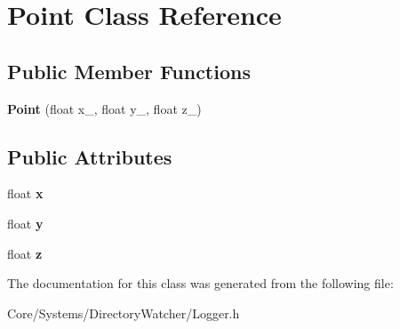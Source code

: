 \hypertarget{classPoint}{\section{Point Class Reference}
\label{classPoint}
}
\subsection*{Public Member Functions}
\begin{DoxyCompactItemize}
\item 
\hypertarget{classPoint_ad56008741db728440b3d469e5fb5cc82}{{\bfseries Point} (float x\-\_\-, float y\-\_\-, float z\-\_\-)}\label{classPoint_ad56008741db728440b3d469e5fb5cc82}

\end{DoxyCompactItemize}
\subsection*{Public Attributes}
\begin{DoxyCompactItemize}
\item 
\hypertarget{classPoint_a05dfe2dfbde813ad234b514f30e662f1}{float {\bfseries x}}\label{classPoint_a05dfe2dfbde813ad234b514f30e662f1}

\item 
\hypertarget{classPoint_a6101960c8d2d4e8ea1d32c9234bbeb8d}{float {\bfseries y}}\label{classPoint_a6101960c8d2d4e8ea1d32c9234bbeb8d}

\item 
\hypertarget{classPoint_a9a666531e0e99adff132be93d2407d0c}{float {\bfseries z}}\label{classPoint_a9a666531e0e99adff132be93d2407d0c}

\end{DoxyCompactItemize}


The documentation for this class was generated from the following file\-:\begin{DoxyCompactItemize}
\item 
Core/\-Systems/\-Directory\-Watcher/Logger.\-h\end{DoxyCompactItemize}
